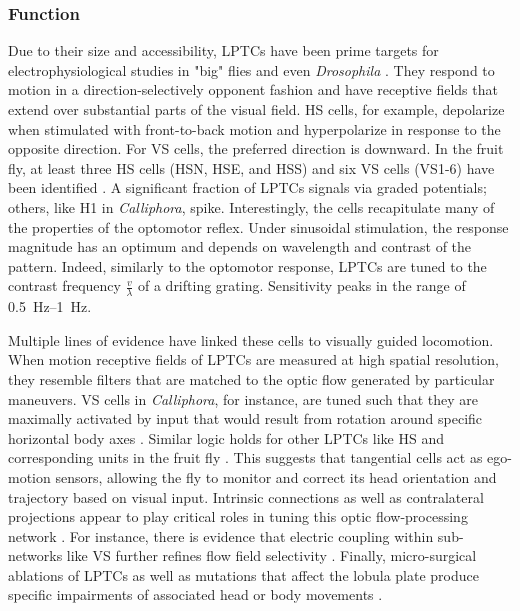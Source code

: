 \subsubsection{Function}
Due to their size and accessibility, LPTCs have been prime targets for electrophysiological studies in "big" flies \citep{Hausen:1976aa,Hausen:1982aa,Hausen:1982bb,Hengstenberg:1982aa,Borst:2010fk} and even \textit{Drosophila} \citep{Joesch:2008fo,Schnell:2010ik}. They respond to motion in a direction-selectively opponent fashion and have receptive fields that extend over substantial parts of the visual field. HS cells, for example, depolarize when stimulated with front-to-back motion and hyperpolarize in response to the opposite direction. For VS cells, the preferred direction is downward. In the fruit fly, at least three HS cells (HSN, HSE, and HSS) and six VS cells (VS1-6) have been identified \citep{Joesch:2008fo,Schnell:2010ik}. A significant fraction of LPTCs signals via graded potentials; others, like H1 in \textit{Calliphora}, spike. Interestingly, the cells recapitulate many of the properties of the optomotor reflex. Under sinusoidal stimulation, the response magnitude has an optimum and depends on wavelength and contrast of the pattern. Indeed, similarly to the optomotor response, LPTCs are tuned to the contrast frequency $\frac{v}{\lambda}$ of a drifting grating. Sensitivity peaks in the range of \SIrange{0.5}{1}{\hertz}.

Multiple lines of evidence have linked these cells to visually guided locomotion. When motion receptive fields of LPTCs are measured at high spatial resolution, they resemble filters that are matched to the optic flow generated by particular maneuvers. VS cells in \textit{Calliphora}, for instance, are tuned such that they are maximally activated by input that would result from rotation around specific horizontal body axes \citep{Krapp:1996}. Similar logic holds for other LPTCs like HS and corresponding units in the fruit fly \citep{Krapp:1998aa,Schnell:2010ik}. This suggests that tangential cells act as ego-motion sensors, allowing the fly to monitor and correct its head orientation and trajectory based on visual input. Intrinsic connections as well as contralateral projections appear to play critical roles in tuning this optic flow-processing network \citep{Borst:2011kk,Weber:2012dr}. For instance, there is evidence that electric coupling within sub-networks like VS further refines flow field selectivity \citep{Haag:2004ho}. Finally, micro-surgical ablations of LPTCs as well as mutations that affect the lobula plate produce specific impairments of associated head or body movements \citep{Heisenberg:1978aa,Geiger:1981aa,Hausen:1983js}.

